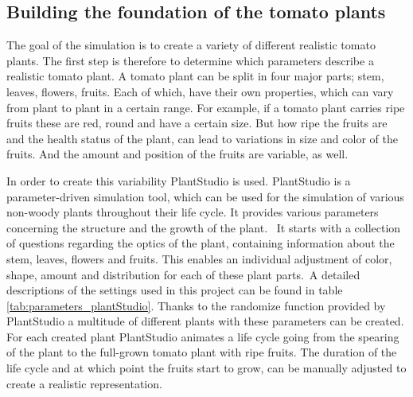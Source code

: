 \subsection{Building the foundation of the tomato plants}

The goal of the simulation is to create a variety of different realistic tomato plants. The first step is therefore to determine which parameters describe a realistic tomato plant. A tomato plant can be split in four major parts; stem, leaves, flowers, fruits. Each of which, have their own properties, which can vary from plant to plant in a certain range. For example, if a tomato plant carries ripe fruits these are red, round and have a certain size. But how ripe the fruits are and the health status of the plant, can lead to variations in size and color of the fruits. And the amount and position of the fruits are variable, as well. 

In order to create this variability PlantStudio is used. PlantStudio is a parameter-driven simulation tool, which can be used for the simulation of various non-woody plants throughout their life cycle. It provides various parameters concerning the structure and the growth of the plant.  It starts with a collection of questions regarding the optics of the plant, containing information about the stem, leaves, flowers and fruits. This enables an individual adjustment of color, shape, amount and distribution for each of these plant parts. A detailed descriptions of the settings used in this project can be found in table \ref{tab:parameters_plantStudio}. Thanks to the randomize function provided by PlantStudio a multitude of different plants with these parameters can be created.\\

For each created plant PlantStudio animates a life cycle going from the spearing of the plant to the full-grown tomato plant with ripe fruits. The duration of the life cycle and at which point the fruits start to grow, can be manually adjusted to create a realistic representation. \\




